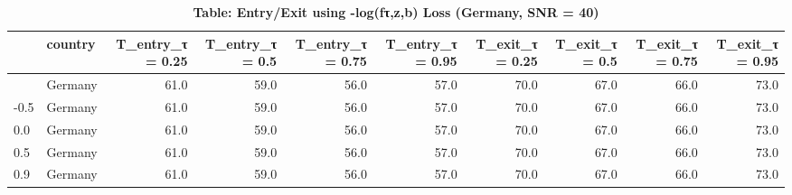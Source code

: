 \begin{table}[t]
\caption*{
{\large \textbf{Table: Entry/Exit using -log(fτ,z,b) Loss (Germany, SNR = 40)}}
} 
\begin{tabular*}{\linewidth}{@{\extracolsep{\fill}}l|lrrrrrrrr}
\toprule
 & country & T\_entry\_τ = 0.25 & T\_entry\_τ = 0.5 & T\_entry\_τ = 0.75 & T\_entry\_τ = 0.95 & T\_exit\_τ = 0.25 & T\_exit\_τ = 0.5 & T\_exit\_τ = 0.75 & T\_exit\_τ = 0.95 \\ 
\midrule\addlinespace[2.5pt]
-0.9 & Germany & 61.0 & 59.0 & 56.0 & 57.0 & 70.0 & 67.0 & 66.0 & 73.0 \\ 
-0.5 & Germany & 61.0 & 59.0 & 56.0 & 57.0 & 70.0 & 67.0 & 66.0 & 73.0 \\ 
0.0 & Germany & 61.0 & 59.0 & 56.0 & 57.0 & 70.0 & 67.0 & 66.0 & 73.0 \\ 
0.5 & Germany & 61.0 & 59.0 & 56.0 & 57.0 & 70.0 & 67.0 & 66.0 & 73.0 \\ 
0.9 & Germany & 61.0 & 59.0 & 56.0 & 57.0 & 70.0 & 67.0 & 66.0 & 73.0 \\ 
\bottomrule
\end{tabular*}
\end{table}

